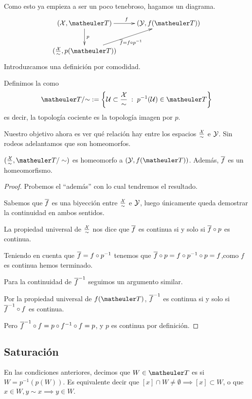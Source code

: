 Como esto ya empieza a ser un poco tenebroso, hagamos un diagrama.
\begin{equation*}
	\xymatrix{
		(\X,\T) \ar[r]^f \ar[d]^p& (\Y,f(\T))\\
		(\frac{\X}{\sim},p(\T))\ar[ru]_{\adher{f}=f\circ p^{-1}} & \\
	}
\end{equation*}
Introduzcamos una definición por comodidad.
\begin{defi}
	Definimos la  como
	\[\T/\mathord{\sim} := \left\{\U\subset\frac{\X}{\sim} \midc p^{-1}(\U)\in\T\right\}\]
	es decir, la topología cociente es la topología imagen por $p$.
\end{defi}
Nuestro objetivo ahora es ver qué relación hay entre los espacios $\frac{\mathcal{X}}{\sim}$ e $\mathcal{Y}$. Sin rodeos adelantamos que son homeomorfos.
\begin{prop}
	$(\frac{\X}{\sim},\T/\sim)$ es homeomorfo a $(\Y,f(\T))$. Además, $\overline{f}$ es un homeomorfismo.
\end{prop}
\begin{proof}
	Probemos el ``además'' con lo cual tendremos el resultado.
	
	Sabemos que $\overline{f}$ es una biyección entre $\frac{\mathcal{X}}{\sim}$ e $\mathcal{Y}$, luego únicamente queda demostrar la continuidad en ambos sentidos.
	
	La propiedad universal de $\frac{\mathcal{X}}{\sim}$ nos dice que $\overline{f}$ es continua si y solo si $\overline{f}\circ p$ es continua.
	
	Teniendo en cuenta que $\overline{f}=f\circ p^{-1}$ tenemos que $\overline{f}\circ p=f\circ p^{-1}\circ p=f$,como $f$ es continua hemos terminado.
	
	Para la continuidad de $\overline{f}^{-1}$ seguimos un argumento similar.
	
	Por la propiedad universal de $f(\T)$, $\overline{f}^{-1}$ es continua si y solo si $\overline{f}^{-1}\circ f$ es continua.
	
	Pero $\overline{f}^{-1}\circ f=p\circ f^{-1}\circ f=p$, y $p$ es continua por definición.
\end{proof}
\subsection{Saturación}
\begin{defi}
	En las condiciones anteriores, decimos que $W\in\T$ es  si $W=p^{-1}(p(W))$. Es equivalente decir que $[x]\cap W\neq\emptyset\implies [x]\subset W$, o que $x\in W,y\sim x\implies y\in W$.
\end{defi}

